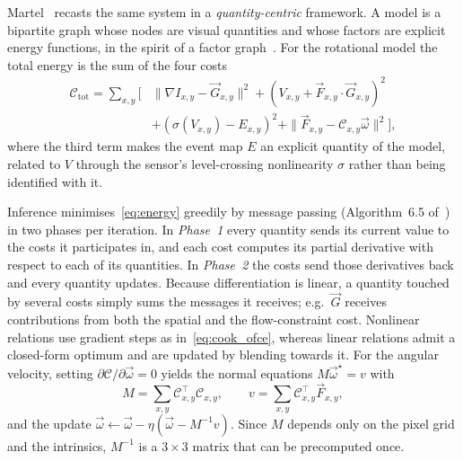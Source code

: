 \documentclass[journal]{IEEEtran}
\newcommand{\Imap}{I}
\newcommand{\Vmap}{V}
\newcommand{\Gmap}{\vec{G}}
\newcommand{\Fmap}{\vec{F}}
\newcommand{\Cmat}{\mathcal{C}}
\newcommand{\wvec}{\vec{\omega}}
\begin{document}
Martel~\cite{martel2019thesis} recasts the same system in a
\emph{quantity-centric} framework. A model is a bipartite graph whose nodes are
visual quantities and whose factors are explicit energy functions, in the spirit
of a factor graph~\cite{kschischang2001}. For the rotational model the total energy is
the sum of the four costs
\begin{align}
\mathcal{C}_{\text{tot}} = \sum_{x,y} \Big[ &
  \|\nabla \Imap_{x,y}-\Gmap_{x,y}\|^2
+ (\Vmap_{x,y}+\Fmap_{x,y}\cdot\Gmap_{x,y})^2 \nonumber\\
&+ (\sigma(\Vmap_{x,y})-E_{x,y})^2
+ \|\Fmap_{x,y}-\Cmat_{x,y}\wvec\|^2 \Big],
\label{eq:energy}
\end{align}
where the third term makes the event map $E$ an explicit quantity of the model,
related to $\Vmap$ through the sensor's level-crossing nonlinearity $\sigma$
rather than being identified with it.

Inference minimises~\eqref{eq:energy} greedily by message passing
(Algorithm~6.5 of~\cite{martel2019thesis}) in two phases per iteration. In
\emph{Phase~1} every quantity sends its current value to the costs it
participates in, and each cost computes its partial derivative with respect to
each of its quantities. In \emph{Phase~2} the costs send those derivatives back
and every quantity updates. Because differentiation is linear, a quantity
touched by several costs simply sums the messages it receives; e.g.\ $\Gmap$
receives contributions from both the spatial and the flow-constraint cost.
Nonlinear relations use gradient steps as in~\eqref{eq:cook_ofce}, whereas linear
relations admit a closed-form optimum and are updated by blending towards it. For
the angular velocity, setting $\partial \mathcal{C}/\partial\wvec = 0$ yields the
normal equations $M\wvec^\star = v$ with
\begin{equation}
M=\sum_{x,y}\Cmat_{x,y}^{\!\top}\Cmat_{x,y}, \qquad
v=\sum_{x,y}\Cmat_{x,y}^{\!\top}\Fmap_{x,y},
\label{eq:normaleq}
\end{equation}
and the update $\wvec \leftarrow \wvec - \eta(\wvec - M^{-1}v)$. Since $M$
depends only on the pixel grid and the intrinsics, $M^{-1}$ is a $3\times3$
matrix that can be precomputed once.
\end{document}
